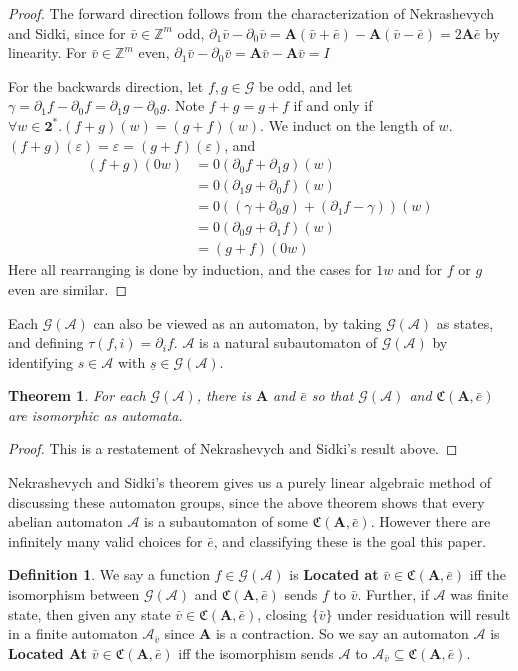 \documentclass{article}
\newcommand{\A}{\mathcal{A}}
\newcommand{\G}{\mathcal{G}}
\newcommand{\C}{\mathfrak{C}(\Am,\e)}
\newcommand{\Z}{\mathbb{Z}}
\newcommand{\2}{\textbf{2}}
\newcommand{\Am}{\textbf{A}}
\newcommand{\del}{\partial}
\newcommand{\vv}{\bar{v}}
\newcommand{\e}{\bar{e}}
\newtheorem{thm}{Theorem}
\theoremstyle{definition}
\newtheorem{defn}{Definition}
\begin{document}
\begin{proof}
  The forward direction follows from the characterization of Nekrashevych
  and Sidki, since for $\vv \in \Z^m$ odd, 
  $\del_1 \vv - \del_0 \vv = \Am (\vv + \e) - \Am (\vv - \e) = 2 \Am \e$
  by linearity. For $\vv \in \Z^m$ even, 
  $\del_1 \vv - \del_0 \vv = \Am \vv - \Am \vv = I$

  For the backwards direction, let $f,g \in \G$ be odd, and let 
  $\gamma = \del_1 f - \del_0 f = \del_1 g - \del_0 g$.
  Note $f+g = g+f$ if and only if $\forall w \in \2^*. (f+g)(w) = (g+f)(w)$.
  We induct on the length of $w$.  
  $(f+g)(\varepsilon) = \varepsilon = (g+f)(\varepsilon)$, and 
  \begin{align*}
    (f+g)(0w) &= 0(\del_0 f + \del_1 g)(w)\\
              &= 0(\del_1 g + \del_0 f)(w)\\
              &= 0((\gamma + \del_0 g) + (\del_1 f - \gamma))(w)\\
              &= 0(\del_0 g + \del_1 f)(w)\\
              &= (g+f)(0w)
  \end{align*}
  Here all rearranging is done by induction, and the cases for $1w$ and for
  $f$ or $g$ even are similar.
\end{proof}

Each $\G(\A)$ can also be viewed as an automaton, by taking $\G(\A)$ 
as states, and defining $\tau(f,i) = \del_i f$. $\A$ is a natural subautomaton
of $\G(\A)$ by identifying $s \in \A$ with $\underline{s} \in \G(\A)$.

\begin{thm}
  For each $\G(\A)$, there is $\Am$ and $\e$ so that 
  $\G(\A)$ and $\C$ are isomorphic as automata.
\end{thm}

\begin{proof}
  This is a restatement of Nekrashevych and Sidki's result above.
\end{proof}

Nekrashevych and Sidki's theorem gives us a purely linear algebraic method
of discussing these automaton groups, since the above theorem shows that
every abelian automaton $\A$ is a subautomaton of some $\C$. 
However there are infinitely many valid choices for $\e$, and classifying 
these is the goal this paper. 

\begin{defn}
  We say a function $f \in \G(\A)$ is \textbf{Located at} $\vv \in \C$ iff 
  the isomorphism between $\G(\A)$ and $\C$ sends $f$ to $\vv$. Further, if
  $\A$ was finite state, then given any state $\vv \in \C$, closing 
  $\{ \vv \}$ under residuation will result in a finite automaton 
  $\A_{\vv}$ since $\Am$ is a contraction. So we say an automaton $\A$ is 
  \textbf{Located At} $\vv \in \C$ iff the isomorphism sends $\A$ to 
  $\A_{\vv} \subseteq \C$. 
\end{defn}
\end{document}
